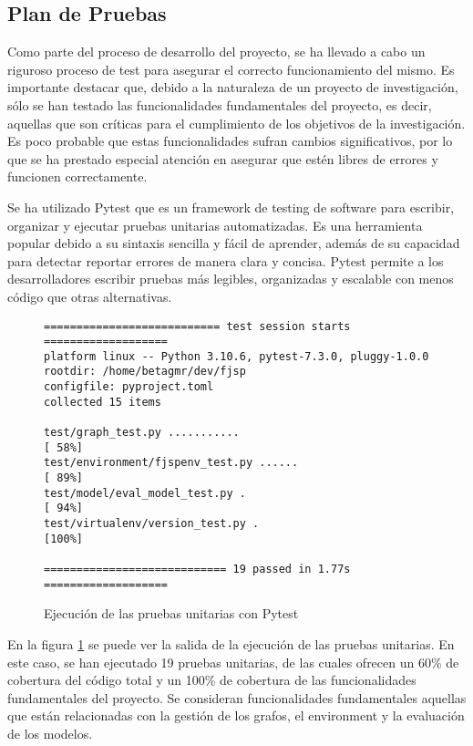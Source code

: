 \subsection{Plan de Pruebas}
Como parte del proceso de desarrollo del proyecto, se ha llevado a cabo un riguroso 
proceso de test para asegurar el correcto funcionamiento del mismo. Es importante 
destacar que, debido a la naturaleza de un proyecto de investigación, sólo se han 
testado las funcionalidades fundamentales del proyecto, es decir, aquellas que 
son críticas para el cumplimiento de los objetivos de la investigación. Es poco 
probable que estas funcionalidades sufran cambios significativos, por lo que se ha 
prestado especial atención en asegurar que estén libres de errores y funcionen correctamente.\medskip

Se ha utilizado Pytest\cite{pytest} que es un framework de testing de software para escribir, 
organizar y ejecutar pruebas unitarias automatizadas. Es una herramienta popular 
debido a su sintaxis sencilla y fácil de aprender, además de su capacidad para detectar 
reportar errores de manera clara y concisa. Pytest permite a los desarrolladores 
escribir pruebas más legibles, organizadas y escalable con menos código 
que otras alternativas. 

\begin{figure}[ht]
    \label{fig:pytest-output}
    \begin{lstlisting}
=========================== test session starts ===================
platform linux -- Python 3.10.6, pytest-7.3.0, pluggy-1.0.0
rootdir: /home/betagmr/dev/fjsp
configfile: pyproject.toml
collected 15 items                                                         

test/graph_test.py ...........                               [ 58%]
test/environment/fjspenv_test.py ......                      [ 89%]
test/model/eval_model_test.py .                              [ 94%]
test/virtualenv/version_test.py .                            [100%]

============================ 19 passed in 1.77s =================== 
    \end{lstlisting}
    \caption{Ejecución de las pruebas unitarias con Pytest}
\end{figure}

En la figura \ref{fig:pytest-output} se puede ver la salida de la ejecución de las
pruebas unitarias. En este caso, se han ejecutado 19 pruebas unitarias, de las cuales
ofrecen un 60\% de cobertura del código total y un 100\% de cobertura de las funcionalidades
fundamentales del proyecto. Se consideran funcionalidades fundamentales aquellas que
están relacionadas con la gestión de los grafos, el environment y la evaluación de los
modelos.

